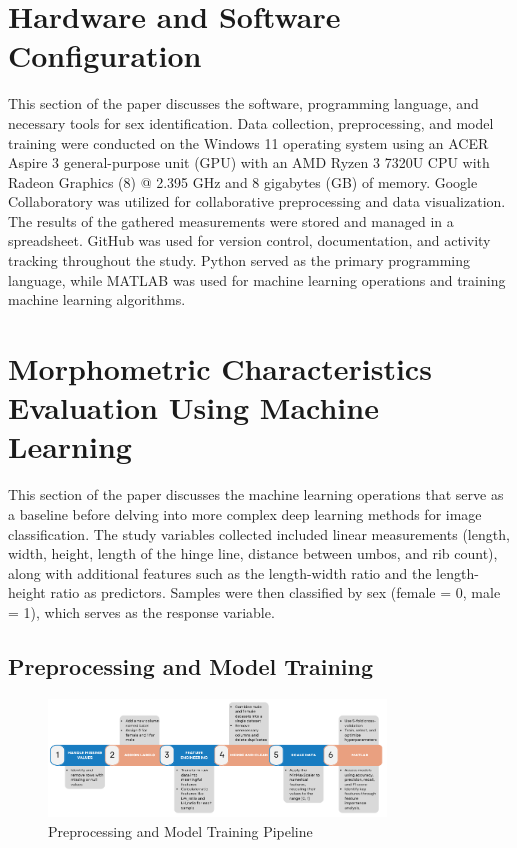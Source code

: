 \section{Hardware and Software Configuration}
This section of the paper discusses the software, programming language, and necessary tools for sex identification. Data collection, preprocessing, and model training were conducted on the Windows 11 operating system using an ACER Aspire 3 general-purpose unit (GPU) with an AMD Ryzen 3 7320U CPU with Radeon Graphics (8) @ 2.395 GHz and 8 gigabytes (GB) of memory. Google Collaboratory was utilized for collaborative preprocessing and data visualization. The results of the gathered measurements were stored and managed in a spreadsheet. GitHub was used for version control, documentation, and activity tracking throughout the study. Python served as the primary programming language, while MATLAB was used for machine learning operations and training machine learning algorithms.


\section{Morphometric Characteristics Evaluation Using Machine Learning }
\label{sec:ml models}

This section of the paper discusses the machine learning operations that serve as a baseline before delving into more complex deep learning methods for image classification. The study variables collected included linear measurements (length, width, height, length of the hinge line, distance between umbos, and rib count), along with additional features such as the length-width ratio and the length-height ratio as predictors. Samples were then classified by sex (female = 0, male = 1), which serves as the response variable.

\subsection{Preprocessing and Model Training}
\label{sec:pre-processing}

\begin{figure}[!htbp]
	\centering
	\includegraphics[width=0.8\textwidth]{figures/pipeline.png}
	\caption{Preprocessing and Model Training Pipeline}
	\label{fig: pipeline}
\end{figure}

